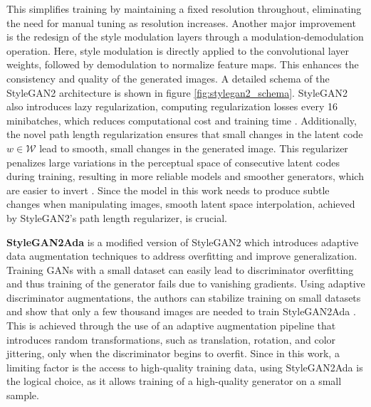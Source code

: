 This simplifies training by maintaining a fixed resolution throughout, eliminating the need for manual tuning as resolution increases. Another major improvement is the redesign of the style modulation layers through a modulation-demodulation operation. Here, style modulation is directly applied to the convolutional layer weights, followed by demodulation to normalize feature maps. 
This enhances the consistency and quality of the generated images. A detailed schema of the StyleGAN2 architecture is shown in figure \ref{fig:stylegan2_schema}. StyleGAN2 also introduces lazy regularization, computing regularization losses every 16 minibatches, which reduces computational cost and training time \citep[p.5]{stylegan2}. 
Additionally, the novel path length regularization ensures that small changes in the latent code $w \in \mathcal{W}$ lead to smooth, small changes in the generated image. This regularizer penalizes large variations in the perceptual space of consecutive latent codes during training, resulting in more reliable models and smoother generators, which are easier to invert \citep[p.5]{stylegan2}. Since the model in this work needs to produce subtle changes when manipulating images, smooth latent space interpolation, achieved by StyleGAN2's path length regularizer, is crucial.

\textbf{StyleGAN2Ada} \citep{stylegan2ada} is a modified version of StyleGAN2 which introduces adaptive data augmentation techniques to address overfitting and improve generalization. Training GANs with a small dataset can easily lead to discriminator overfitting and thus training of the generator fails due to vanishing gradients. Using adaptive discriminator augmentations, the authors can stabilize training on small datasets and show that only a few thousand images are needed to train StyleGAN2Ada \citep[p.1]{stylegan2ada}. This is achieved through the use of an adaptive augmentation pipeline that introduces random transformations, such as translation, rotation, and color jittering, only when the discriminator begins to overfit. Since in this work, a limiting factor is the access to high-quality training data, using StyleGAN2Ada is the logical choice, as it allows training of a high-quality generator on a small sample. 






